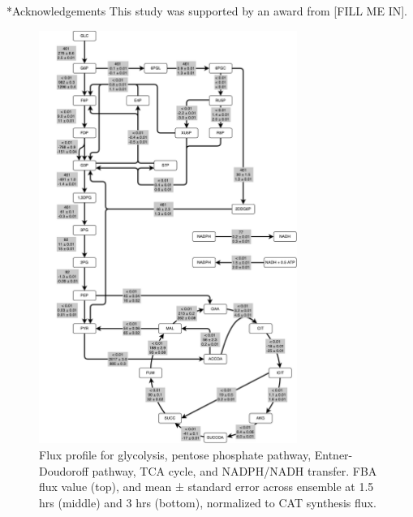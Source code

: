 \documentclass[12pt]{article}
\makeatletter
\renewcommand\section{\@startsection
	{subsection}{2}{0mm}
	{-0.2in}
	{0.05\baselineskip}
	{\normalfont\large\bfseries}}
\makeatother
\begin{document}
\clearpage


\section*{Acknowledgements}
This study was supported by an award from [FILL ME IN].
\clearpage



\clearpage

\begin{figure}[ht]
\centering
\includegraphics[width=0.75\textwidth]{./Figures/Network.pdf}
\caption{Flux profile for glycolysis, pentose phosphate pathway, Entner-Doudoroff pathway, TCA cycle, and NADPH/NADH transfer. FBA flux value (top), and mean ± standard error across ensemble at 1.5 hrs (middle) and 3 hrs (bottom), normalized to CAT synthesis flux.}
\label{fig:Network}
\end{figure}
\end{document}

